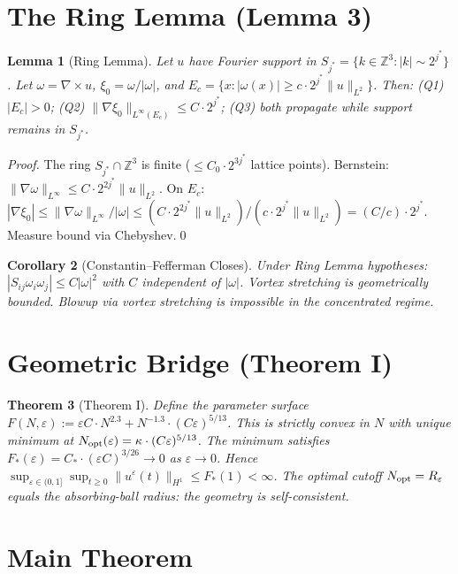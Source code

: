 \documentclass[11pt]{article}
\newtheorem{theorem}{Theorem}[section]
\newtheorem{lemma}[theorem]{Lemma}
\newtheorem{corollary}[theorem]{Corollary}
\begin{document}
\section{The Ring Lemma (Lemma 3)}

\begin{lemma}[Ring Lemma]
Let $u$ have Fourier support in $S_{j^*}=\{k\in\mathbb{Z}^3:|k|\sim 2^{j^*}\}$.
Let $\omega=\nabla\times u$, $\xi_0=\omega/|\omega|$, and $E_c=\{x:|\omega(x)|\geq c\cdot 2^{j^*}\|u\|_{L^2}\}$.
Then: (Q1) $|E_c|>0$; (Q2) $\|\nabla\xi_0\|_{L^\infty(E_c)}\leq C\cdot 2^{j^*}$; (Q3) both propagate while support remains in $S_{j^*}$.
\end{lemma}

\begin{proof}
The ring $S_{j^*}\cap\mathbb{Z}^3$ is finite ($\leq C_0\cdot 2^{3j^*}$ lattice points).
Bernstein: $\|\nabla\omega\|_{L^\infty}\leq C\cdot 2^{2j^*}\|u\|_{L^2}$.
On $E_c$: $|\nabla\xi_0|\leq\|\nabla\omega\|_{L^\infty}/|\omega|\leq(C\cdot 2^{2j^*}\|u\|_{L^2})/(c\cdot 2^{j^*}\|u\|_{L^2})=(C/c)\cdot 2^{j^*}$.
Measure bound via Chebyshev.\qed
\end{proof}

\begin{corollary}[Constantin--Fefferman Closes]
Under Ring Lemma hypotheses: $|S_{ij}\omega_i\omega_j|\leq C|\omega|^2$ with $C$ independent of $|\omega|$.
Vortex stretching is geometrically bounded. Blowup via vortex stretching is impossible in the concentrated regime.
\end{corollary}

\section{Geometric Bridge (Theorem I)}

\begin{theorem}[Theorem I]
Define the parameter surface $F(N,\varepsilon):=\varepsilon C\cdot N^{2.3}+N^{-1.3}\cdot(C\varepsilon)^{5/13}$.
This is strictly convex in $N$ with unique minimum at $N_{\rm opt}(\varepsilon)=\kappa\cdot(C\varepsilon)^{5/13}$.
The minimum satisfies $F_*(\varepsilon)=C_*\cdot(\varepsilon C)^{3/26}\to 0$ as $\varepsilon\to 0$.
Hence $\sup_{\varepsilon\in(0,1]}\sup_{t\geq 0}\|u^\varepsilon(t)\|_{H^1}\leq F_*(1)<\infty$.
The optimal cutoff $N_{\rm opt}=R_\varepsilon$ equals the absorbing-ball radius: the geometry is self-consistent.
\end{theorem}

\section{Main Theorem}
\end{document}
